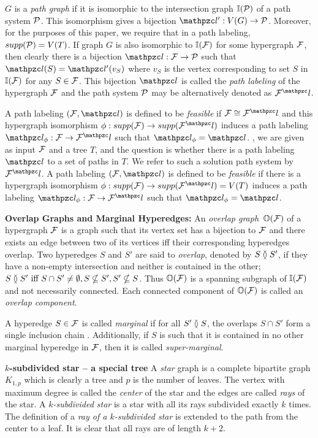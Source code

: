  $G$ is a {\em path graph} if it is isomorphic to the
intersection graph $\mathbb I({\cal P})$ of a path system ${\cal P}$.  This
isomorphism gives a bijection $\cl': V(G) \rightarrow \cP$. Moreover,
for the purposes of this paper, we require that in a path labeling,
$supp({\cal P}) = V(T)$.  If graph $G$ is also isomorphic to $\mathbb I({\cal F})$ for
some hypergraph ${\cal F}$, then clearly there is a bijection $\cl: \cF
\rightarrow \cP$ such that $\cl(S) = \cl'(v_S)$ where $v_S$ is the
vertex corresponding to set $S$ in $\mathbb I({\cal F})$ for any $S \in
{\cal F}$. This bijection $\cl$ is called the {\em path labeling} of the
hypergraph ${\cal F}$ and the path system ${\cal P}$ may be alternatively
denoted as $\cF^\cl$.


A path labeling $(\cF, \cl)$ is defined to be {\em feasible} if $\cF
\cong \cF^\cl$ and this hypergraph isomorphism $\phi: supp(\cF)
\rightarrow supp(\cF^\cl)$ induces a path labeling $\cl_\phi: \cF
\rightarrow \cF^\cl$ such that $\cl_\phi = \cl$.  ,
we are given as input ${\cal F}$ and a tree $T$, and the question is
whether there is a path labeling $\cl$ to a set of paths in $T$.  We
refer to such a solution path system by $\cF^\cl$.  A path labeling
$(\cF, \cl)$ is defined to be {\em feasible} if
there is a hypergraph isomorphism $\phi: supp(\cF) \rightarrow
supp(\cF^\cl)=V(T)$ induces a path labeling $\cl_\phi: \cF \rightarrow
\cF^\cl$ such that $\cl_\phi = \cl$.

{\bf Overlap Graphs and Marginal Hyperedges:} An {\em overlap graph}\,
$\mathbb O({\cal F})$ of a hypergraph ${\cal F}$ is a graph such that its vertex set
has a bijection to ${\cal F}$ and there exists an edge between two of its
vertices iff their corresponding hyperedges overlap. Two hyperedges
$S$ and $S'$ are said to {\em overlap}, denoted by $S \between S'$, if
they have a non-empty intersection and neither is contained in the
other; $S \between S' \text{ iff } S \cap S' \ne \emptyset, S
\nsubseteq S', S' \nsubseteq S$. Thus $\mathbb O({\cal F})$ is a spanning
subgraph of $\mathbb I({\cal F})$ and not necessarily connected. Each connected
component of $\mathbb O({\cal F})$ is called an {\em overlap component}.

A hyperedge $S \in {\cal F}$ is called {\em marginal} if for all $S'
\between S$, the overlaps $S \cap S'$ form a single inclusion chain
\cite{kklv10}. Additionally, if $S$ is such that it is contained in no
other marginal hyperedge in ${\cal F}$, then it is called {\em
  super-marginal}.

{\bf $k$-subdivided star -- a special tree} A {\em star} graph is a
complete bipartite graph $K_{1,p}$ which is clearly a tree and $p$ is
the number of leaves. The vertex with maximum degree is called the
{\em center} of the star and the edges are called {\em rays} of the
star. A {\em $k$-subdivided star} is a star with all its rays
subdivided exactly $k$ times. The definition of a {\em ray of a
  $k$-subdivided star} is extended to the path from the center to a
leaf. It is clear that all rays are of length $k+2$.



